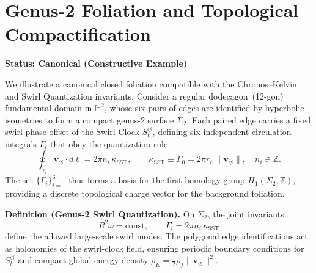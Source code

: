 \documentclass[10pt,reprint,aps,onecolumn,nofootinbib]{revtex4-2}
\begin{document}
    \section{Genus-2 Foliation and Topological Compactification}

    \textbf{Status: Canonical (Constructive Example)}

    \noindent
    We illustrate a canonical closed foliation compatible with the Chronos–Kelvin and Swirl Quantization
    invariants.  Consider a regular dodecagon~(12-gon) fundamental domain in $\mathbb H^2$, whose
    six pairs of edges are identified by hyperbolic isometries to form a compact genus-2 surface
    $\Sigma_2$.  Each paired edge carries a fixed swirl-phase offset of the Swirl Clock
    $S_t^{\boldsymbol{\circlearrowleft}}$, defining six independent circulation integrals
    $\Gamma_i$ that obey the quantization rule
    \begin{equation}
        \oint_{\gamma_i}\mathbf v_{\!\boldsymbol{\circlearrowleft}}\!\cdot d\boldsymbol\ell
        = 2\pi n_i\,\kappa_{\text{SST}},\qquad
        \kappa_{\text{SST}} \equiv \Gamma_0 = 2\pi r_c\,\lVert \mathbf{v}_{\!\boldsymbol{\circlearrowleft}}\rVert,
        \quad n_i\in\mathbb Z .
    \end{equation}
    The set $\{\Gamma_i\}_{i=1}^{6}$ thus forms a basis for the first homology group
    $H_1(\Sigma_2,\mathbb Z)$, providing a discrete topological charge vector for the
    background foliation.

    \vspace{0.5em}
    \noindent
    \textbf{Definition (Genus-2 Swirl Quantization).}
    On $\Sigma_2$, the joint invariants
    \begin{equation}
        R^2\omega = \mathrm{const},
        \qquad
        \Gamma_i = 2\pi n_i\,\kappa_{\text{SST}}
    \end{equation}
    define the allowed large-scale swirl modes.  The polygonal edge identifications act as
    holonomies of the swirl-clock field, ensuring periodic boundary conditions for
    $S_t^{\boldsymbol{\circlearrowleft}}$ and compact global energy density
    $\rho_{\!E}=\tfrac{1}{2}\rho_{\!f}\lVert\mathbf v_{\!\boldsymbol{\circlearrowleft}}\rVert^2$.
\end{document}
